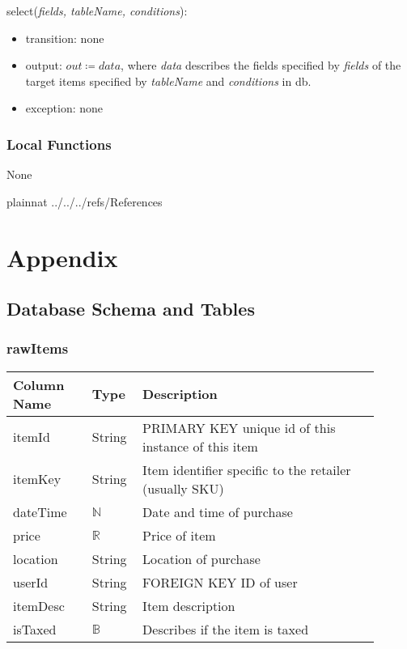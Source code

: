 \documentclass[12pt, titlepage]{article}
\begin{document}
\noindent select(\textit{fields, tableName, conditions}):
\begin{itemize}
\item transition: none
\item output: $out \coloneqq data$, where \textit{data} describes the fields specified by \textit{fields} of the target items specified by \textit{tableName} and \textit{conditions} in db.
\item exception: none
\end{itemize}

\subsubsection{Local Functions}
None

\newpage

 {plainnat}
 {../../../refs/References}

\newpage

\section{Appendix} \label{Appendix}

\subsection{Database Schema and Tables} \label{dbAppendix}

\subsubsection{rawItems}
\begin{table}[H]
  \begin{tabular}{|p{0.2\linewidth}|p{0.1\linewidth}|p{0.6\linewidth}|}
    \hline
    \textbf{Column Name} & \textbf{Type} & \textbf{Description} \\
    \hline
    itemId & String & PRIMARY KEY unique id of this instance of this item \\
    \hline
    itemKey & String & Item identifier specific to the retailer (usually SKU) \\
    \hline
    dateTime & $\mathbb{N}$ & Date and time of purchase \\
    \hline
    price & $\mathbb{R}$ & Price of item \\
    \hline
    location & String & Location of purchase \\
    \hline
    userId & String & FOREIGN KEY ID of user\\
    \hline
    itemDesc & String & Item description\\
    \hline
    isTaxed & $\mathbb{B}$ & Describes if the item is taxed\\
    \hline
  \end{tabular}
\end{table}
\end{document}

